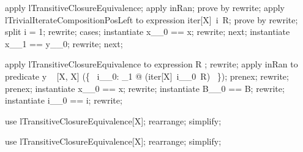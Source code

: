 \begin{LPScript}\begin{forget}[lTransitiveClosureConnectsRan]
apply lTransitiveClosureEquivalence;
apply inRan;
prove by rewrite;
apply lTrivialIterateCompositionPosLeft to expression iter[X]~i~R;
prove by rewrite;
split i = 1;
rewrite;
cases;
instantiate x\_\_0 == x;
rewrite;
next;
instantiate x\_\_1 == y\_\_0;
rewrite;
next;
\end{forget}\end{LPScript}

\begin{LPScript}\begin{forget}[lTransitiveClosureConnectsRan2]
apply lTransitiveClosureEquivalence to expression R \plus [X];
rewrite;
apply inRan to predicate y \in
    \ran~ [X, X] (\bigcup [(X \cross  X)] \{~  i\_\_0: \nat _1{} @ (iter[X]~i\_\_0~R) ~\});
prenex;
rewrite;
prenex;
instantiate x\_\_0 == x;
rewrite;
instantiate B\_\_0 == B;
rewrite;
instantiate i\_\_0 == i;
rewrite;
\end{forget}\end{LPScript}

\begin{LPScript}\begin{forget}[lTransitiveClosureMemberIsIteratedClosureMember]
use lTransitiveClosureEquivalence[X];
rearrange;
simplify;
\end{forget}\end{LPScript}

\begin{LPScript}\begin{forget}[lIteratedTransitiveClosureMemberIsTransitiveClosureMember]
use lTransitiveClosureEquivalence[X];
rearrange;
simplify;
\end{forget}\end{LPScript}


